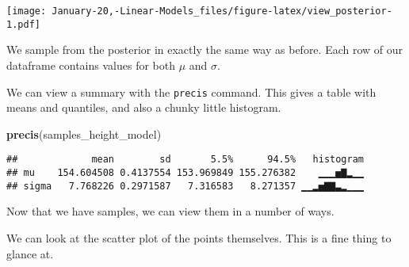 \documentclass[]{article}
\newenvironment{Shaded}{\begin{snugshade}}{\end{snugshade}}
\newcommand{\DataTypeTok}[1]{\textcolor[rgb]{0.13,0.29,0.53}{#1}}
\newcommand{\FloatTok}[1]{\textcolor[rgb]{0.00,0.00,0.81}{#1}}
\newcommand{\KeywordTok}[1]{\textcolor[rgb]{0.13,0.29,0.53}{\textbf{#1}}}
\newcommand{\NormalTok}[1]{#1}
\newcommand{\OperatorTok}[1]{\textcolor[rgb]{0.81,0.36,0.00}{\textbf{#1}}}
\newcommand{\OtherTok}[1]{\textcolor[rgb]{0.56,0.35,0.01}{#1}}
\newcommand{\StringTok}[1]{\textcolor[rgb]{0.31,0.60,0.02}{#1}}
\begin{document}
\begin{Shaded}
\end{Shaded}

\texttt{[image: January-20,-Linear-Models\_files/figure-latex/view\_posterior-1.pdf]}

We sample from the posterior in exactly the same way as before. Each row
of our dataframe contains values for both \(\mu\) and \(\sigma\).

\begin{Shaded}
\end{Shaded}

We can view a summary with the \texttt{precis} command. This gives a
table with means and quantiles, and also a chunky little histogram.

\begin{Shaded}
\begin{Highlighting}[]
\KeywordTok{precis}\NormalTok{(samples_height_model)}
\end{Highlighting}
\end{Shaded}

\begin{verbatim}
##             mean        sd       5.5%      94.5%   histogram
## mu    154.604508 0.4137554 153.969849 155.276382    ▁▁▁▅▇▂▁▁
## sigma   7.768226 0.2971587   7.316583   8.271357 ▁▁▂▅▇▇▃▂▁▁▁
\end{verbatim}

Now that we have samples, we can view them in a number of ways.

We can look at the scatter plot of the points themselves. This is a fine
thing to glance at.
\end{document}
